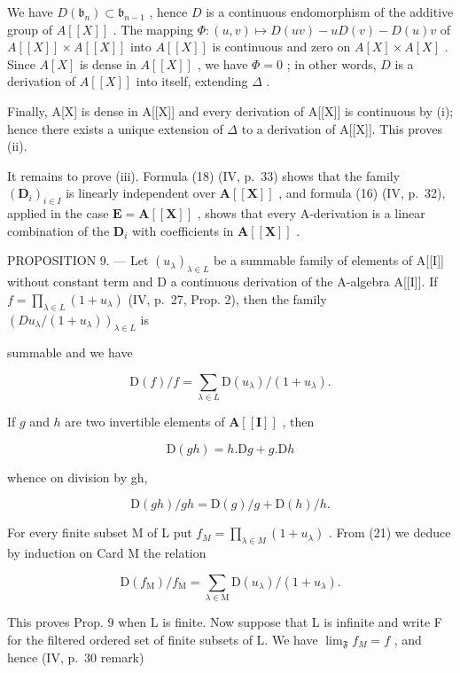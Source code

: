 We have \(D(\mathfrak{b}_n) \subset \mathfrak{b}_{n-1}\) , hence \(D\) is a continuous endomorphism of the additive group of \(A[[X]]\) . The mapping \(\Phi: (u, v) \mapsto D(uv) - uD(v) - D(u)v\) of \(A[[X]] \times A[[X]]\) into \(A[[X]]\) is continuous and zero on \(A[X] \times A[X]\) . Since \(A[X]\) is dense in \(A[[X]]\) , we have \(\Phi = 0\) ; in other words, \(D\) is a derivation of \(A[[X]]\) into itself, extending \(\Delta\) .

Finally, A{[}X{]} is dense in A{[}{[}X{]}{]} and every derivation of A{[}{[}X{]}{]} is continuous by (i); hence there exists a unique extension of \(\Delta\) to a derivation of A{[}{[}X{]}{]}. This proves (ii).

It remains to prove (iii). Formula (18) (IV, p.~33) shows that the family \((\mathbf{D}_i)_{i\in I}\) is linearly independent over \(\mathbf{A}[[\mathbf{X}]]\) , and formula (16) (IV, p.~32), applied in the case \(\mathbf{E} = \mathbf{A}[[\mathbf{X}]]\) , shows that every A-derivation is a linear combination of the \(\mathbf{D}_i\) with coefficients in \(\mathbf{A}[[\mathbf{X}]]\) .

PROPOSITION 9. --- Let \((u_{\lambda})_{\lambda \in L}\) be a summable family of elements of A{[}{[}I{]}{]} without constant term and D a continuous derivation of the A-algebra A{[}{[}I{]}{]}. If \(f = \prod_{\lambda \in L} (1 + u_{\lambda})\) (IV, p.~27, Prop. 2), then the family \((D u_{\lambda} / (1 + u_{\lambda}))_{\lambda \in L}\) is

summable and we have

\[
\mathrm{D} (f) / f = \sum_ {\lambda \in L} \mathrm{D} (u _ {\lambda}) / (1 + u _ {\lambda}).\tag{20}
\]

If \(g\) and \(h\) are two invertible elements of \(\mathbf{A}[[\mathbf{I}]]\) , then

\[
\mathrm{D} (g h) = h. \mathrm{D} g + g. \mathrm{D} h
\]

whence on division by gh,

\[
\mathrm{D} (g h) / g h = \mathrm{D} (g) / g + \mathrm{D} (h) / h.\tag{21}
\]

For every finite subset M of L put \(f_{M} = \prod_{\lambda \in M} (1 + u_{\lambda})\) . From (21) we deduce by induction on Card M the relation

\[
\mathrm{D} \left(f _ {\mathrm{M}}\right) / f _ {\mathrm{M}} = \sum_ {\lambda \in \mathrm{M}} \mathrm{D} \left(u _ {\lambda}\right) / \left(1 + u _ {\lambda}\right).\tag{22}
\]

This proves Prop. 9 when L is finite. Now suppose that L is infinite and write F for the filtered ordered set of finite subsets of L. We have \(\lim_{\mathfrak{F}} f_{M} = f\) , and hence (IV, p.~30 remark)

